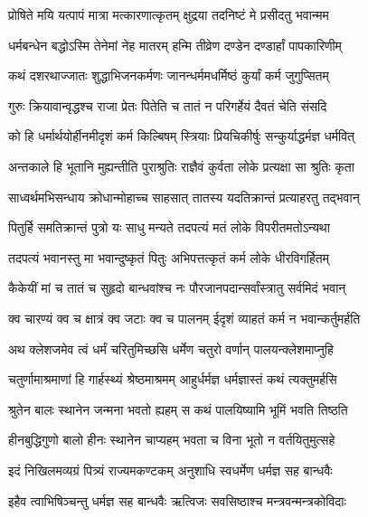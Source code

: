 \twolineshloka
{प्रोषिते मयि यत्पापं मात्रा मत्कारणात्कृतम्}
{क्षुद्रया तदनिष्टं मे प्रसीदतु भवान्मम} %

\twolineshloka
{धर्मबन्धेन बद्धोऽस्मि तेनेमां नेह मातरम्}
{हन्मि तीव्रेण दण्डेन दण्डार्हां पापकारिणीम्} %

\twolineshloka
{कथं दशरथाज्जातः शुद्धाभिजनकर्मणः}
{जानन्धर्ममधर्मिष्ठं कुर्यां कर्म जुगुप्सितम्} %

\twolineshloka
{गुरुः क्रियावान्वृद्धश्च राजा प्रेतः पितेति च}
{तातं न परिगर्हेयं दैवतं चेति संसदि} %

\twolineshloka
{को हि धर्मार्थयोर्हीनमीदृशं कर्म किल्बिषम्}
{स्त्रियाः प्रियचिकीर्षुः सन्कुर्याद्धर्मज्ञ धर्मवित्} %

\twolineshloka
{अन्तकाले हि भूतानि मुह्यन्तीति पुराश्रुतिः}
{राज्ञैवं कुर्वता लोके प्रत्यक्षा सा श्रुतिः कृता} %

\twolineshloka
{साध्वर्थमभिसन्धाय क्रोधान्मोहाच्च साहसात्}
{तातस्य यदतिक्रान्तं प्रत्याहरतु तद्भवान्} %

\twolineshloka
{पितुर्हि समतिक्रान्तं पुत्रो यः साधु मन्यते}
{तदपत्यं मतं लोके विपरीतमतोऽन्यथा} %

\twolineshloka
{तदपत्यं भवानस्तु मा भवान्दुष्कृतं पितुः}
{अभिपत्तत्कृतं कर्म लोके धीरविगर्हितम्} %

\twolineshloka
{कैकेयीं मां च तातं च सुहृदो बान्धवांश्च नः}
{पौरजानपदान्सर्वांस्त्रातु सर्वमिदं भवान्} %

\twolineshloka
{क्व चारण्यं क्व च क्षात्रं क्व जटाः क्व च पालनम्}
{ईदृशं व्याहतं कर्म न भवान्कर्तुमर्हति} %

\twolineshloka
{अथ क्लेशजमेव त्वं धर्मं चरितुमिच्छसि}
{धर्मेण चतुरो वर्णान् पालयन्क्लेशमाप्नुहि} %

\twolineshloka
{चतुर्णामाश्रमाणां हि गार्हस्थ्यं श्रेष्ठमाश्रमम्}
{आहुर्धर्मज्ञ धर्मज्ञास्तं कथं त्यक्तुमर्हसि} %

\twolineshloka
{श्रुतेन बालः स्थानेन जन्मना भवतो ह्यहम्}
{स कथं पालयिष्यामि भूमिं भवति तिष्ठति} %

\twolineshloka
{हीनबुद्धिगुणो बालो हीनः स्थानेन चाप्यहम्}
{भवता च विना भूतो न वर्तयितुमुत्सहे} %

\twolineshloka
{इदं निखिलमव्यग्रं पित्र्यं राज्यमकण्टकम्}
{अनुशाधि स्वधर्मेण धर्मज्ञ सह बान्धवैः} %

\twolineshloka
{इहैव त्वाभिषिञ्चन्तु धर्मज्ञ सह बान्धवैः}
{ऋत्विजः सवसिष्ठाश्च मन्त्रवन्मन्त्रकोविदाः} %

